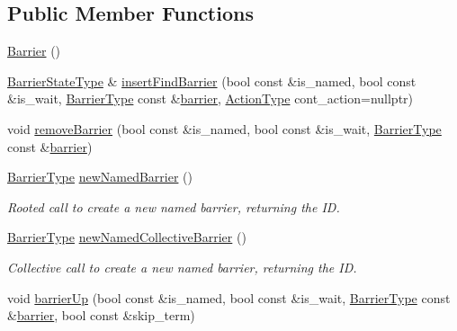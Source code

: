 \subsection*{Public Member Functions}
\begin{DoxyCompactItemize}
\item 
\hyperlink{structvt_1_1collective_1_1barrier_1_1_barrier_aa69e5135299fa366a2c59ac96a9f318d}{Barrier} ()
\item 
\hyperlink{structvt_1_1collective_1_1barrier_1_1_barrier_a9b612818f7b44ca65f2caee0dee094f3}{Barrier\+State\+Type} \& \hyperlink{structvt_1_1collective_1_1barrier_1_1_barrier_aa3f74f986e523701c1d85ed97d3ad5a4}{insert\+Find\+Barrier} (bool const \&is\+\_\+named, bool const \&is\+\_\+wait, \hyperlink{namespacevt_a25e481f0d6bbc7204db23d1c87a62e77}{Barrier\+Type} const \&\hyperlink{structvt_1_1collective_1_1barrier_1_1_barrier_a05124050c7d353a4f3475ee1875dd46a}{barrier}, \hyperlink{namespacevt_ae0a5a7b18cc99d7b732cb4d44f46b0f3}{Action\+Type} cont\+\_\+action=nullptr)
\item 
void \hyperlink{structvt_1_1collective_1_1barrier_1_1_barrier_a56128065b0b7735958b998dd97a4938b}{remove\+Barrier} (bool const \&is\+\_\+named, bool const \&is\+\_\+wait, \hyperlink{namespacevt_a25e481f0d6bbc7204db23d1c87a62e77}{Barrier\+Type} const \&\hyperlink{structvt_1_1collective_1_1barrier_1_1_barrier_a05124050c7d353a4f3475ee1875dd46a}{barrier})
\item 
\hyperlink{namespacevt_a25e481f0d6bbc7204db23d1c87a62e77}{Barrier\+Type} \hyperlink{structvt_1_1collective_1_1barrier_1_1_barrier_a0d8e74149ddca96f06c1ff6071b73a74}{new\+Named\+Barrier} ()
\begin{DoxyCompactList}\small\item\em Rooted call to create a new named barrier, returning the ID. \end{DoxyCompactList}\item 
\hyperlink{namespacevt_a25e481f0d6bbc7204db23d1c87a62e77}{Barrier\+Type} \hyperlink{structvt_1_1collective_1_1barrier_1_1_barrier_a3e101519fbcfa9eee139bf02f991f085}{new\+Named\+Collective\+Barrier} ()
\begin{DoxyCompactList}\small\item\em Collective call to create a new named barrier, returning the ID. \end{DoxyCompactList}\item 
void \hyperlink{structvt_1_1collective_1_1barrier_1_1_barrier_a79096d77724cb095c08696e8af673dfb}{barrier\+Up} (bool const \&is\+\_\+named, bool const \&is\+\_\+wait, \hyperlink{namespacevt_a25e481f0d6bbc7204db23d1c87a62e77}{Barrier\+Type} const \&\hyperlink{structvt_1_1collective_1_1barrier_1_1_barrier_a05124050c7d353a4f3475ee1875dd46a}{barrier}, bool const \&skip\+\_\+term)

\end{DoxyCompactItemize}
